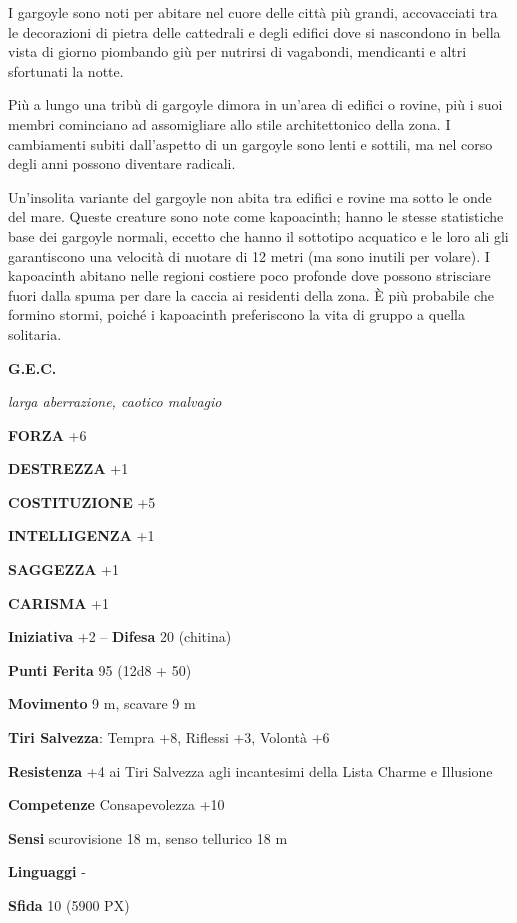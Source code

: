 \begin{multicols}{2}
	I gargoyle sono noti per abitare nel cuore delle città più grandi, accovacciati tra le decorazioni di pietra delle cattedrali e degli edifici dove si nascondono in bella vista di giorno piombando giù per nutrirsi di vagabondi, mendicanti e altri sfortunati la notte.

	Più a lungo una tribù di gargoyle dimora in un'area di edifici o rovine, più i suoi membri cominciano ad assomigliare allo stile architettonico della zona. I cambiamenti subiti dall'aspetto di un gargoyle sono lenti e sottili, ma nel corso degli anni possono diventare radicali.

	Un'insolita variante del gargoyle non abita tra edifici e rovine ma sotto le onde del mare. Queste creature sono note come kapoacinth; hanno le stesse statistiche base dei gargoyle normali, eccetto che hanno il sottotipo acquatico e le loro ali gli garantiscono una velocità di nuotare di 12 metri (ma sono inutili per volare). I kapoacinth abitano nelle regioni costiere poco profonde dove possono strisciare fuori dalla spuma per dare la caccia ai residenti della zona. È più probabile che formino stormi, poiché i kapoacinth preferiscono la vita di gruppo a quella solitaria.

	\medskip{}\textbf{G.E.C.}

	\textit{larga aberrazione, caotico malvagio}

	\textbf{FORZA} +6

	\textbf{DESTREZZA} +1

	\textbf{COSTITUZIONE} +5

	\textbf{INTELLIGENZA} +1

	\textbf{SAGGEZZA} +1

	\textbf{CARISMA} +1

	\textbf{Iniziativa} +2 -- \textbf{Difesa} 20 (chitina)

	\textbf{Punti Ferita} 95 (12d8 + 50)

	\textbf{Movimento} 9 m, scavare 9 m

	\textbf{Tiri Salvezza}: Tempra +8, Riflessi +3, Volontà +6

	\textbf{Resistenza} +4 ai Tiri Salvezza agli incantesimi della Lista Charme e Illusione

	\textbf{Competenze} Consapevolezza +10

	\textbf{Sensi} scurovisione 18 m, senso tellurico 18 m

	\textbf{Linguaggi} -

	\textbf{Sfida} 10 (5900 PX)


\end{multicols}
